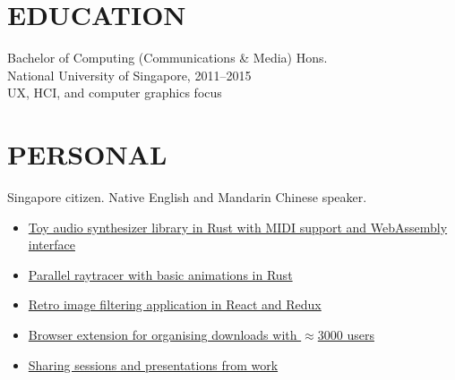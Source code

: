 \documentclass[line, margin]{res}
\begin{document}
\begin{resume}
    \section{EDUCATION}
        Bachelor of Computing (Communications \& Media) Hons. \\
        National University of Singapore, 2011--2015 \\
        UX, HCI, and computer graphics focus

    \section{PERSONAL}
        Singapore citizen. Native English and Mandarin Chinese speaker.
        \vspace{0.075cm}
        \begin{itemize}[leftmargin=*]
        \itemsep0em 
        \item \href{https://github.com/gyng/synthrs}{Toy audio synthesizer library in Rust with MIDI support and WebAssembly interface}
        \item \href{https://github.com/gyng/rust-raytracer}{Parallel raytracer with basic animations in Rust}
        \item \href{https://github.com/gyng/ditherer}{Retro image filtering application in React and Redux}
        \item \href{https://github.com/gyng/save-in}{Browser extension for organising downloads with $\approx$3000 users}
        \item \href{https://github.com/gyng/book}{Sharing sessions and presentations from work}
        \end{itemize}


\end{resume}
\end{document}
